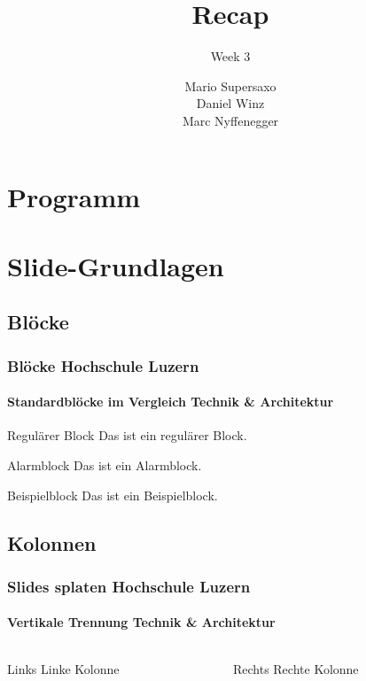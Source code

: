 \documentclass{beamer}
\title{Recap}
\subtitle{Week 3}
\author{Mario Supersaxo \\ Daniel Winz \\ Marc Nyffenegger}
\begin{document}
\maketitle


\section*{Programm}
\begin{frame}
\tableofcontents
\end{frame}

\section{Slide-Grundlagen}

\subsection{Blöcke}

\begin{frame}
	\frametitle{Blöcke \hfill \footnotesize{Hochschule Luzern}}
	\framesubtitle{Standardblöcke im Vergleich \hfill \tiny{Technik \& Architektur}}
	
	\begin{block}{Regulärer Block}
		Das ist ein regulärer Block.
	\end{block}

	\begin{alertblock}{Alarmblock}
		Das ist ein Alarmblock.
	\end{alertblock}

	\begin{exampleblock}{Beispielblock}
		Das ist ein Beispielblock.
	\end{exampleblock}
\end{frame}

\subsection{Kolonnen}

\begin{frame}
	\frametitle{Slides splaten \hfill \footnotesize{Hochschule Luzern}}
	\framesubtitle{Vertikale Trennung \hfill \tiny{Technik \& Architektur}}

	\begin{columns}
		\begin{column}{5cm}
			\begin{block}{Links}
				Linke Kolonne
			\end{block}
		\end{column}
		\begin{column}{5cm}
			\begin{block}{Rechts}
				Rechte Kolonne
			\end{block}
		\end{column}
	\end{columns}
\end{frame}




\end{document}
